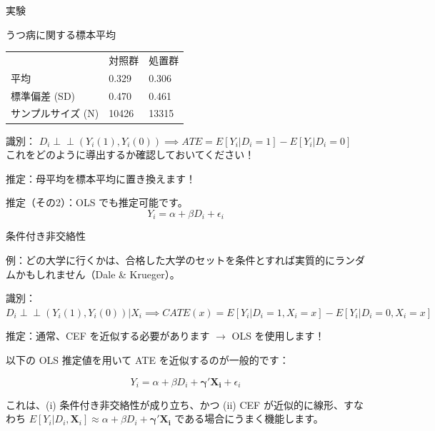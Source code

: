 \documentclass[11pt,handout]{beamer}
\newenvironment{wideitemize}{\itemize\addtolength{\itemsep}{10pt}}{\enditemize}
\newcommand{\indep}{\perp\!\!\!\!\perp}
\begin{document}
\begin{frame}{実験}

うつ病に関する標本平均
\begin{tabular}{lll}
	& 対照群 & 処置群 \\
	平均 & 0.329 & 0.306\\
	標準偏差 (SD) & 0.470 &  0.461 \\
	サンプルサイズ (N) & 10426 & 13315  
\end{tabular}


\begin{wideitemize}
	\item
	識別： \pause{}$D_i \indep (Y_i(1),Y_i(0))  \implies ATE = E[Y_i | D_i =1 ] - E[Y_i | D_i = 0]$ \\ \medskip これをどのように導出するか確認しておいてください！
	
	\pause
	\item
	推定：母平均を標本平均に置き換えます！
	
	\pause
	\item
	推定（その2）：OLS でも推定可能です。
	$$Y_i = \alpha + \beta D_i + \epsilon_i$$
\end{wideitemize}
	
\end{frame}


\begin{frame}{条件付き非交絡性}
	\begin{wideitemize}
		\item
		例：どの大学に行くかは、合格した大学のセットを条件とすれば実質的にランダムかもしれません（Dale \& Krueger）。
		
		\pause
		\item
		識別： $D_i \indep (Y_i(1),Y_i(0)) | X_i  \implies CATE(x) = E[Y_i | D_i =1 , X_i = x] - E[Y_i | D_i = 0, X_i = x]$ 
		
		\pause
		\item
		推定：通常、CEF を近似する必要があります $\rightarrow$ OLS を使用します！
		
		\item
		以下の OLS 推定値を用いて ATE を近似するのが一般的です：
		
		$$Y_i = \alpha + \beta D_i + \bm{\gamma}' \bm{X_i} + \epsilon_i$$
		
		\pause
		\item
		これは、(i) 条件付き非交絡性が成り立ち、かつ (ii) CEF が近似的に線形、すなわち $E[Y_i | D_i, \bm{X}_i] \approx \alpha + \beta D_i + \bm{\gamma}' \bm{X_i} $ である場合にうまく機能します。
	\end{wideitemize}	
\end{frame}
\end{document}
